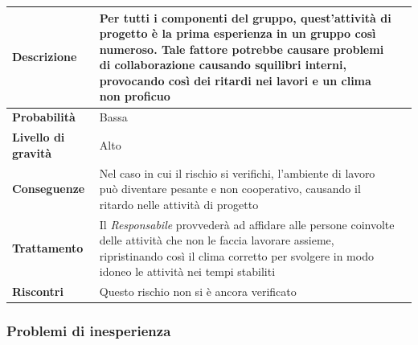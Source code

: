 \begin{center}
	
	\begin{tabular}{|>{\centering}m{4cm} ||>{\centering}m{8cm} |>{\centering\arraybackslash}m{0pt}@{}|}
		\hline
		\textbf{Descrizione} & Per tutti i componenti del gruppo,
		quest'attività di progetto è la prima esperienza in un gruppo
		così numeroso. Tale fattore potrebbe causare problemi di
		collaborazione causando squilibri interni, provocando così dei
		ritardi nei lavori e un clima non proficuo & \\[2ex]
		\hline	
		\textbf{Probabilità} & Bassa &\\[1ex]
		\hline
		\textbf{Livello di gravità} & Alto & \\[1ex]
		\hline
		\textbf{Conseguenze} & Nel caso in cui il rischio si verifichi, l'ambiente di lavoro può diventare pesante e non cooperativo, causando il ritardo nelle attività di progetto & \\[1ex]
		\hline
		\textbf{Trattamento} & Il \emph{Responsabile}  provvederà ad affidare
		alle persone coinvolte delle attività che non le faccia
		lavorare assieme, ripristinando così il clima corretto per
		svolgere in modo idoneo le attività nei tempi stabiliti & \\[1ex] 
		\hline
		\textbf{Riscontri} & Questo rischio non si è ancora verificato & \\[1ex]
		\hline
	\end{tabular}
	
\end{center}

\subsubsection{Problemi di inesperienza}

